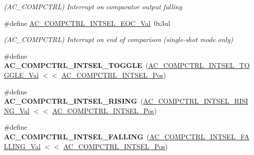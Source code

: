 \begin{DoxyCompactItemize}
\begin{DoxyCompactList}\small\item\em (A\+C\+\_\+\+C\+O\+M\+P\+C\+T\+R\+L) Interrupt on comparator output falling \end{DoxyCompactList}\item 
\hypertarget{group___s_a_m_l21___a_c_gad5b505d36ebe43b2bd56cc421c3f4ff7}{}\#define \hyperlink{group___s_a_m_l21___a_c_gad5b505d36ebe43b2bd56cc421c3f4ff7}{A\+C\+\_\+\+C\+O\+M\+P\+C\+T\+R\+L\+\_\+\+I\+N\+T\+S\+E\+L\+\_\+\+E\+O\+C\+\_\+\+Val}~0x3ul\label{group___s_a_m_l21___a_c_gad5b505d36ebe43b2bd56cc421c3f4ff7}

\begin{DoxyCompactList}\small\item\em (A\+C\+\_\+\+C\+O\+M\+P\+C\+T\+R\+L) Interrupt on end of comparison (single-\/shot mode only) \end{DoxyCompactList}\item 
\hypertarget{group___s_a_m_l21___a_c_gad625cf1bb60b19177f500707a62660ad}{}\#define {\bfseries A\+C\+\_\+\+C\+O\+M\+P\+C\+T\+R\+L\+\_\+\+I\+N\+T\+S\+E\+L\+\_\+\+T\+O\+G\+G\+L\+E}~(\hyperlink{group___s_a_m_l21___a_c_gaea16ed868355094251d2cdf1c1208f98}{A\+C\+\_\+\+C\+O\+M\+P\+C\+T\+R\+L\+\_\+\+I\+N\+T\+S\+E\+L\+\_\+\+T\+O\+G\+G\+L\+E\+\_\+\+Val} $<$$<$ \hyperlink{group___s_a_m_l21___a_c_gaf17b8514f92bb9fa7999607938ab4994}{A\+C\+\_\+\+C\+O\+M\+P\+C\+T\+R\+L\+\_\+\+I\+N\+T\+S\+E\+L\+\_\+\+Pos})\label{group___s_a_m_l21___a_c_gad625cf1bb60b19177f500707a62660ad}

\item 
\hypertarget{group___s_a_m_l21___a_c_ga385ca51ada82da45ec0eb140b94dab9e}{}\#define {\bfseries A\+C\+\_\+\+C\+O\+M\+P\+C\+T\+R\+L\+\_\+\+I\+N\+T\+S\+E\+L\+\_\+\+R\+I\+S\+I\+N\+G}~(\hyperlink{group___s_a_m_l21___a_c_gabeacc3b641a9b183888b92ce7e3361fd}{A\+C\+\_\+\+C\+O\+M\+P\+C\+T\+R\+L\+\_\+\+I\+N\+T\+S\+E\+L\+\_\+\+R\+I\+S\+I\+N\+G\+\_\+\+Val} $<$$<$ \hyperlink{group___s_a_m_l21___a_c_gaf17b8514f92bb9fa7999607938ab4994}{A\+C\+\_\+\+C\+O\+M\+P\+C\+T\+R\+L\+\_\+\+I\+N\+T\+S\+E\+L\+\_\+\+Pos})\label{group___s_a_m_l21___a_c_ga385ca51ada82da45ec0eb140b94dab9e}

\item 
\hypertarget{group___s_a_m_l21___a_c_gace0a903d986283e62cc85c487c55e806}{}\#define {\bfseries A\+C\+\_\+\+C\+O\+M\+P\+C\+T\+R\+L\+\_\+\+I\+N\+T\+S\+E\+L\+\_\+\+F\+A\+L\+L\+I\+N\+G}~(\hyperlink{group___s_a_m_l21___a_c_ga67a517d1951cfe979b43f56a11cebaf0}{A\+C\+\_\+\+C\+O\+M\+P\+C\+T\+R\+L\+\_\+\+I\+N\+T\+S\+E\+L\+\_\+\+F\+A\+L\+L\+I\+N\+G\+\_\+\+Val} $<$$<$ \hyperlink{group___s_a_m_l21___a_c_gaf17b8514f92bb9fa7999607938ab4994}{A\+C\+\_\+\+C\+O\+M\+P\+C\+T\+R\+L\+\_\+\+I\+N\+T\+S\+E\+L\+\_\+\+Pos})\label{group___s_a_m_l21___a_c_gace0a903d986283e62cc85c487c55e806}


\end{DoxyCompactItemize}
